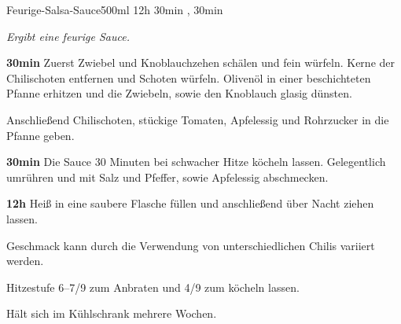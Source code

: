 \documentclass[../recipe-collections/cooking.tex]{subfiles}
\begin{document}
\begin{recipe}{Feurige-Salsa-Sauce}{500ml }{12h 30min , 30min }

  \freeform{}\textit{Ergibt eine feurige Sauce.}


  \textbf{30min}
  Zuerst Zwiebel und Knoblauchzehen schälen und fein würfeln.
  Kerne der Chilischoten entfernen und Schoten würfeln.
  Olivenöl in einer beschichteten Pfanne erhitzen und die Zwiebeln, sowie den Knoblauch glasig dünsten.


  Anschließend Chilischoten, stückige Tomaten, Apfelessig und Rohrzucker in die Pfanne geben.


  \textbf{30min}
  Die Sauce 30 Minuten bei schwacher Hitze köcheln lassen.
  Gelegentlich umrühren und mit Salz und Pfeffer, sowie Apfelessig abschmecken.

  \newstep{}\textbf{12h}
  Heiß in eine saubere Flasche füllen und anschließend über Nacht ziehen lassen.

  \freeform{}\hrulefill{}

  \freeform{}
  Geschmack kann durch die Verwendung von unterschiedlichen Chilis variiert werden.

  \freeform{}
  Hitzestufe 6–7/9 zum Anbraten und 4/9 zum köcheln lassen.

  \freeform{}
  Hält sich im Kühlschrank mehrere Wochen.

\end{recipe}
\end{document}
